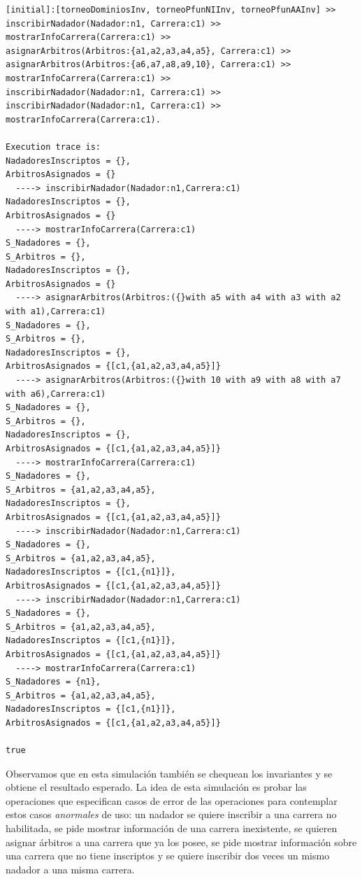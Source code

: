 \documentclass{article}
\begin{document}
\begin{verbatim}
[initial]:[torneoDominiosInv, torneoPfunNIInv, torneoPfunAAInv] >>
inscribirNadador(Nadador:n1, Carrera:c1) >>
mostrarInfoCarrera(Carrera:c1) >>
asignarArbitros(Arbitros:{a1,a2,a3,a4,a5}, Carrera:c1) >>
asignarArbitros(Arbitros:{a6,a7,a8,a9,10}, Carrera:c1) >>
mostrarInfoCarrera(Carrera:c1) >>
inscribirNadador(Nadador:n1, Carrera:c1) >>
inscribirNadador(Nadador:n1, Carrera:c1) >>
mostrarInfoCarrera(Carrera:c1).

Execution trace is:
NadadoresInscriptos = {},  
ArbitrosAsignados = {}
  ----> inscribirNadador(Nadador:n1,Carrera:c1)
NadadoresInscriptos = {},  
ArbitrosAsignados = {}
  ----> mostrarInfoCarrera(Carrera:c1)
S_Nadadores = {},  
S_Arbitros = {},  
NadadoresInscriptos = {},  
ArbitrosAsignados = {}
  ----> asignarArbitros(Arbitros:({}with a5 with a4 with a3 with a2 with a1),Carrera:c1)
S_Nadadores = {},  
S_Arbitros = {},  
NadadoresInscriptos = {},  
ArbitrosAsignados = {[c1,{a1,a2,a3,a4,a5}]}
  ----> asignarArbitros(Arbitros:({}with 10 with a9 with a8 with a7 with a6),Carrera:c1)
S_Nadadores = {},  
S_Arbitros = {},  
NadadoresInscriptos = {},  
ArbitrosAsignados = {[c1,{a1,a2,a3,a4,a5}]}
  ----> mostrarInfoCarrera(Carrera:c1)
S_Nadadores = {},  
S_Arbitros = {a1,a2,a3,a4,a5},  
NadadoresInscriptos = {},  
ArbitrosAsignados = {[c1,{a1,a2,a3,a4,a5}]}
  ----> inscribirNadador(Nadador:n1,Carrera:c1)
S_Nadadores = {},  
S_Arbitros = {a1,a2,a3,a4,a5},  
NadadoresInscriptos = {[c1,{n1}]},  
ArbitrosAsignados = {[c1,{a1,a2,a3,a4,a5}]}
  ----> inscribirNadador(Nadador:n1,Carrera:c1)
S_Nadadores = {},  
S_Arbitros = {a1,a2,a3,a4,a5},  
NadadoresInscriptos = {[c1,{n1}]},  
ArbitrosAsignados = {[c1,{a1,a2,a3,a4,a5}]}
  ----> mostrarInfoCarrera(Carrera:c1)
S_Nadadores = {n1},  
S_Arbitros = {a1,a2,a3,a4,a5},  
NadadoresInscriptos = {[c1,{n1}]},  
ArbitrosAsignados = {[c1,{a1,a2,a3,a4,a5}]}

true
\end{verbatim}

Observamos que en esta simulación también se chequean los invariantes y se obtiene el
resultado esperado. La idea de esta simulación es probar las operaciones que especifican casos
de error de las operaciones para contemplar estos casos \textit{anormales} de uso: un nadador 
se quiere inscribir a una carrera no habilitada, se pide mostrar información de una carrera
inexistente, se quieren asignar árbitros a una carrera que ya los posee, se pide mostrar información
sobre una carrera que no tiene inscriptos y se quiere inscribir dos veces un mismo nadador a una
misma carrera.
\end{document}

